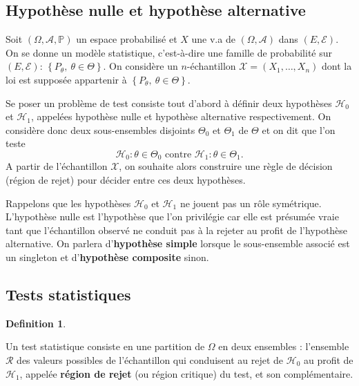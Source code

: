 \documentclass[
]{book}
\theoremstyle{definition}
\newtheorem{definition}{Definition}[chapter]
\theoremstyle{definition}
\theoremstyle{definition}
\theoremstyle{definition}
\theoremstyle{remark}
\begin{document}
\hypertarget{hypothuxe8se-nulle-et-hypothuxe8se-alternative}{%
\subsection{Hypothèse nulle et hypothèse alternative}\label{hypothuxe8se-nulle-et-hypothuxe8se-alternative}}

Soit \((\Omega,\mathcal A, \mathbb{P})\) un espace probabilisé et \(X\) une v.a de \((\Omega,\mathcal A)\) dans \((E,{\mathcal E})\). On se donne un modèle statistique, c'est-à-dire une famille de probabilité sur \((E,{\mathcal E})\): \(\left\{P_\theta,\ \theta\in\Theta\right\}\).
On considère un \(n\)-échantillon \(\mathcal{X}=(X_1,\ldots,X_n)\) dont la loi est supposée appartenir à \(\left\{P_\theta,\ \theta\in\Theta\right\}\).

Se poser un problème de test consiste tout d'abord à définir deux hypothèses \(\mathcal{H}_0\) et \(\mathcal{H}_1\), appelées hypothèse nulle et hypothèse alternative respectivement. On considère donc deux sous-ensembles disjoints \(\Theta_0\) et \(\Theta_1\) de \(\Theta\) et on dit que l'on teste
\[
    \mathcal{H}_0: \theta\in\Theta_0 \textrm{      contre     } \mathcal{H}_1: \theta\in\Theta_1.
\]
A partir de l'échantillon \(\mathcal{X}\), on souhaite alors construire une règle de décision (région de rejet) pour décider entre ces deux hypothèses.

Rappelons que les hypothèses \(\mathcal{H}_0\) et \(\mathcal{H}_1\) ne jouent pas un rôle symétrique. L'hypothèse nulle est l'hypothèse que l'on privilégie car elle est présumée vraie tant que l'échantillon observé ne conduit pas à la rejeter au profit de l'hypothèse alternative. On parlera d'\textbf{hypothèse simple} lorsque le sous-ensemble associé est un singleton et d'\textbf{hypothèse composite} sinon.

\hypertarget{tests-statistiques}{%
\subsection{Tests statistiques}\label{tests-statistiques}}

\begin{definition}
\protect\hypertarget{def:unlabeled-div-1}{}\label{def:unlabeled-div-1}

Un test statistique consiste en une partition de \(\Omega\) en deux ensembles : l'ensemble \(\mathcal R\) des valeurs possibles de l'échantillon qui conduisent au rejet de \(\mathcal{H}_0\) au profit de \(\mathcal{H}_1\), appelée \textbf{région de rejet} (ou région critique) du test, et son complémentaire.

\end{definition}
\end{document}
